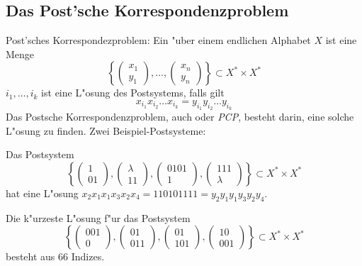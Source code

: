 \subsection{Das Post'sche Korrespondenzproblem}
 Post'sches Korrespondezproblem:{
  Ein  "uber einem endlichen Alphabet $X$ ist eine Menge
  \[\left\{\begin{pmatrix}x_1\\y_1\end{pmatrix}, \dots,
    \begin{pmatrix}x_n\\y_n\end{pmatrix}\right\} \subset X^* \times
  X^*\]
  $i_1, \dots, i_k$ ist eine L"osung des Postsystems, falls gilt
  \[x_{i_1} x_{i_2} \dots x_{i_k} = y_{i_1} y_{i_2} \dots y_{i_k}\]
  Das Postsche Korrespondenzproblem, auch 
   oder 
  \emph{PCP}, besteht darin, eine solche
  L"osung zu finden.
  }
\example Zwei Beispiel-Postsysteme:{
  Das Postsystem
  \[\left\{\begin{pmatrix}1\\01\end{pmatrix},
    \begin{pmatrix}\lambda\\11\end{pmatrix},
    \begin{pmatrix}0101\\1\end{pmatrix},
    \begin{pmatrix}111\\\lambda\end{pmatrix}\right\} \subset X^* \times
  X^*\]
  hat eine L"osung $x_2 x_1 x_1 x_3 x_2 x_4 = 110101111 = y_2 y_1 y_1 y_3
  y_2 y_4$.

  Die k"urzeste L"osung f"ur das Postsystem
  \[\left\{\begin{pmatrix}001\\0\end{pmatrix},
    \begin{pmatrix}01\\011\end{pmatrix},
    \begin{pmatrix}01\\101\end{pmatrix},
    \begin{pmatrix}10\\001\end{pmatrix}\right\} \subset X^* \times
  X^*\]
  besteht aus 66 Indizes.
  }
